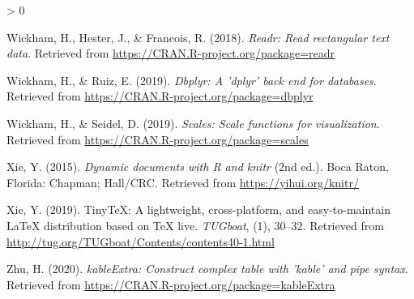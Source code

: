 \documentclass[
  english,
  man, fleqn, noextraspace]{apa6}
\newlength{\cslhangindent}
\newenvironment{CSLReferences}[2] %
 {%
  \setlength{\parindent}{0pt}
  \ifodd #1 \everypar{\setlength{\hangindent}{\cslhangindent}}\ignorespaces\fi
  \ifnum #2 > 0
  \setlength{\parskip}{#2\baselineskip}
  \fi
 }%
 {}
\begin{document}
\begin{CSLReferences}{1}{0}
\leavevmode\hypertarget{ref-R-readr}{}%
Wickham, H., Hester, J., \& Francois, R. (2018). \emph{Readr: Read rectangular text data}. Retrieved from \url{https://CRAN.R-project.org/package=readr}

\leavevmode\hypertarget{ref-R-dbplyr}{}%
Wickham, H., \& Ruiz, E. (2019). \emph{Dbplyr: A 'dplyr' back end for databases}. Retrieved from \url{https://CRAN.R-project.org/package=dbplyr}

\leavevmode\hypertarget{ref-R-scales}{}%
Wickham, H., \& Seidel, D. (2019). \emph{Scales: Scale functions for visualization}. Retrieved from \url{https://CRAN.R-project.org/package=scales}

\leavevmode\hypertarget{ref-R-knitr}{}%
Xie, Y. (2015). \emph{Dynamic documents with {R} and knitr} (2nd ed.). Boca Raton, Florida: Chapman; Hall/CRC. Retrieved from \url{https://yihui.org/knitr/}

\leavevmode\hypertarget{ref-R-tinytex}{}%
Xie, Y. (2019). TinyTeX: A lightweight, cross-platform, and easy-to-maintain LaTeX distribution based on TeX live. \emph{TUGboat}, (1), 30--32. Retrieved from \url{http://tug.org/TUGboat/Contents/contents40-1.html}

\leavevmode\hypertarget{ref-R-kableExtra}{}%
Zhu, H. (2020). \emph{kableExtra: Construct complex table with 'kable' and pipe syntax}. Retrieved from \url{https://CRAN.R-project.org/package=kableExtra}

\end{CSLReferences}

\endgroup
\end{document}

